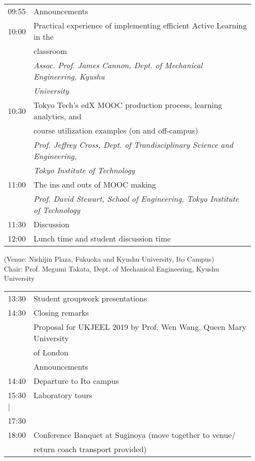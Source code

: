 \noindent\begin{tabular}{|l|l|}
    \hline
    09:55   & Announcements \\
    10:00   & Practical experience of implementing efficient Active Learning in the\\
            & classroom \\
            & \emph{Assoc. Prof. James Cannon, Dept. of Mechanical Engineering, Kyushu}\\
            & \emph{University} \\
    10:30   & Tokyo Tech’s edX MOOC production process, learning analytics, and\\
            & course utilization examples (on and off-campus) \\
            & \emph{Prof. Jeffrey Cross, Dept. of Trandisciplinary Science and Engineering,} \\
            & \emph{Tokyo Institute of Technology} \\
    11:00   & The ins and outs of MOOC making \\
            & \emph{Prof. David Stewart, School of Engineering, Tokyo Institute of Technology} \\
    11:30   & Discussion \\
    12:00   & Lunch time and student discussion time \\

    \hline
\end{tabular}

\newpage
\vspace*{3ex}
 (Venue: Nishijin Plaza, Fukuoka and Kyushu University, Ito Campus) \\
Chair: Prof. Megumi Takata, Dept. of Mechanical Engineering, Kyushu University

\noindent\begin{tabular}{|l|l|}
    \hline
    13:30   & Student groupwork presentations \\
    14:30   & Closing remarks \\
            & Proposal for UKJEEL 2019 by Prof. Wen Wang, Queen Mary University \\
            & of London \\
            & Announcements \\
    14:40   & Departure to Ito campus \\
    15:30   & Laboratory tours \\ %
    \hspace{1em}$\mid$  & \\
    17:30   & \\
    18:00   & Conference Banquet at Suginoya (move together to venue/ \\
            & \hspace{11em} return coach transport provided)\\
    \hline
\end{tabular}



